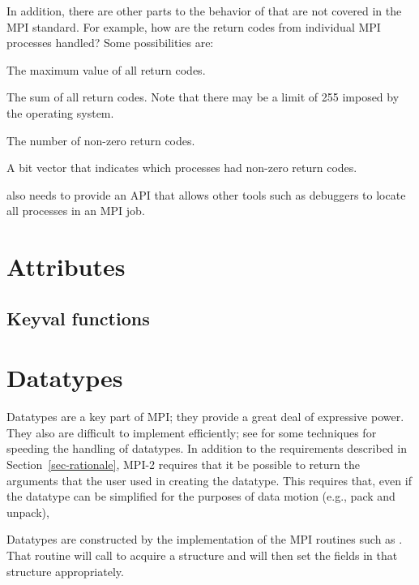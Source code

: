 \documentclass{article}
\begin{document}
In addition, there are other parts to the behavior of 
that are not covered in the MPI standard.  For example, how are the
return codes from individual MPI processes handled?  Some
possibilities are:
\begin{description}
\item The maximum value of all return codes.
\item The sum of all return codes.  Note that there may be
a limit of 255 imposed by the operating system.
\item The number of non-zero return codes.
\item A bit vector that indicates which processes had non-zero return
codes.
\end{description}

 also needs to provide an API that allows other tools such as
debuggers to locate all processes in an MPI job.

\section{Attributes}

\subsection{Keyval functions}




\section{Datatypes}
Datatypes are a key part of MPI; they provide a great deal of expressive
power.  They also are difficult to implement efficiently; see 
\cite{gropp-swider-lusk99,Traeff:1999:FFE} for some techniques for speeding
the handling of datatypes.
In addition to the requirements described in Section~\ref{sec-rationale}, 
MPI-2 requires that it be possible to return the arguments that the user
used in creating the datatype.  This requires that, even if the datatype can
be simplified for the purposes of data motion (e.g., pack and unpack), 

Datatypes are constructed by the implementation of the MPI routines such as 
.  That routine will call
 to acquire a structure and will then set the fields
in that structure appropriately. 




\end{document}
